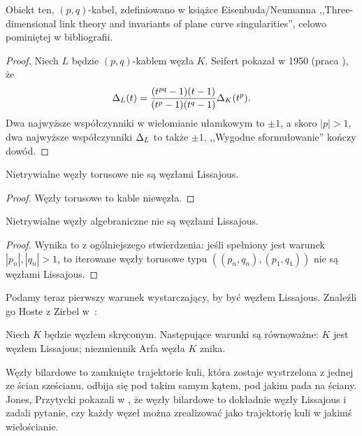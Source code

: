 Obiekt ten, $(p, q)$-kabel, zdefiniowano w książce Eisenbuda/Neumanna ,,Three-dimensional link theory and invariants of plane curve singularities'', celowo pominiętej w bibliografii.

\begin{proof}
	Niech $L$ będzie $(p, q)$-kablem węzła $K$.
	Seifert pokazał w 1950 (praca \cite{seifert50}), że
    \begin{equation}
    	\Delta_L(t) = \frac{(t^{pq}-1)(t-1)}{(t^p-1)(t^q-1)} \Delta_K(t^p).
    \end{equation}
    Dwa najwyższe współczynniki w wielomianie ułamkowym to $\pm 1$, a skoro $|p| > 1$, dwa najwyższe współczynniki $\Delta_L$ to także $\pm 1$.
    ,,Wygodne sformułowanie'' kończy dowód.
\end{proof}

\begin{corollary}
    Nietrywialne węzły torusowe nie są węzłami Lissajous.
\end{corollary}

\begin{proof}
	Węzły torusowe to kable niewęzła.
\end{proof}

\begin{corollary}
    Nietrywialne węzły algebraniczne nie są węzłami Lissajous.
\end{corollary}

\begin{proof}
	Wynika to z ogólniejszego stwierdzenia: jeśli spełniony jest warunek $|p_n|, |q_n| > 1$, to iterowane węzły torusowe typu $((p_n, q_n), (p_1, q_1))$ nie są węzłami Lissajous.
\end{proof}

Podamy teraz pierwszy warunek wystarczający, by być węzłem Lissajous.
Znaleźli go Hoste z Zirbel w~\cite{zirbel06}:

\begin{proposition}
	Niech $K$ będzie węzłem skręconym.
	Następujące warunki są równoważne: $K$ jest węzłem Lissajous; niezmiennik Arfa węzła $K$ znika.
\end{proposition}

Węzły bilardowe to zamknięte trajektorie kuli, która zostaje wystrzelona z jednej ze ścian sześcianu, odbija się pod takim samym kątem, pod jakim pada na ściany.
Jones, Przytycki pokazali w \cite{jones98}, że węzły bilardowe to dokładnie węzły Lissajous i zadali pytanie, czy każdy węzeł można zrealizować jako trajektorię kuli w jakimś wielościanie.

